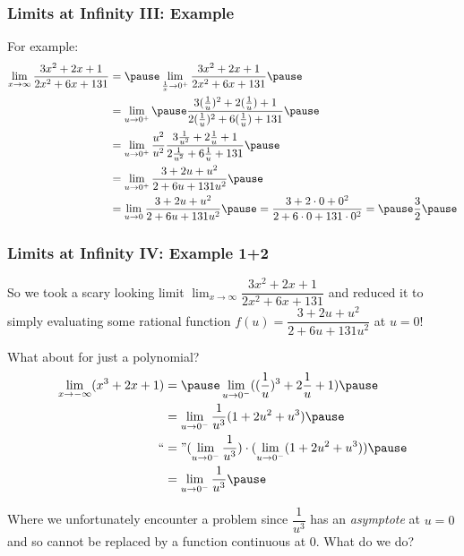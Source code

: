 \documentclass{ltx-talk}
\begin{document}
\begin{frame}
  \frametitle{Limits at Infinity III: Example}

  For example: \pause
  \begin{align}
    \lim_{x \rightarrow \infty} \dfrac{3x^2 + 2x + 1}{2x^2 + 6x + 131} &= \pause \lim_{\frac{1}{x} \rightarrow 0^+} \dfrac{3x^2 + 2x + 1}{2x^2 + 6x + 131} \pause \\
                                                                       &= \lim_{u \rightarrow 0^+} \pause \dfrac{3(\frac{1}{u})^2 + 2(\frac{1}{u}) + 1}{2(\frac{1}{u})^2 + 6(\frac{1}{u}) + 131} \pause \\
                                                                       &= \lim_{u \rightarrow 0^+} \dfrac{u^2}{u^2} \dfrac{3 \frac{1}{u^2} + 2\frac{1}{u} + 1}{2 \frac{1}{u^2} + 6\frac{1}{u} + 131} \pause \\
                                                                       &= \lim_{u \rightarrow 0^+} \dfrac{3 + 2u + u^2}{2 + 6u + 131u^2} \pause \\
                                                                       &= \lim_{u \rightarrow 0} \dfrac{3 + 2u + u^2}{2 + 6u + 131u^2} \pause = \dfrac{3 + 2\cdot 0 + 0^2}{2 + 6\cdot 0 + 131 \cdot 0^2} = \pause \dfrac{3}{2} \pause
  \end{align}
\end{frame}
\begin{frame}
  \frametitle{Limits at Infinity IV: Example 1+2}
  So we took a scary looking limit \pause $\lim_{x \rightarrow \infty} \dfrac{3x^2 + 2x + 1}{2x^2 + 6x + 131}$ \pause
  and reduced it to simply evaluating some rational function \pause $f(u) = \dfrac{3 + 2u + u^2}{2 + 6u + 131u^2}$ at $u = 0$! \pause

  What about for just a polynomial? \pause
  \begin{align}
    \lim_{x \rightarrow - \infty} (x^3 + 2x + 1) &= \pause \lim_{u \rightarrow 0^{-}} ((\dfrac{1}{u})^3 + 2 \dfrac{1}{u} + 1) \pause \\
                                                 &= \lim_{u \rightarrow 0^{-}} \dfrac{1}{u^3} (1 + 2u^2 + u^3) \pause  \\
    ``&=" (\lim_{u \rightarrow 0^{-}} \dfrac{1}{u^3}) \cdot (\lim_{u \rightarrow 0^{-}} (1 + 2u^2 + u^3)) \pause \\
                                                 &= \lim_{u \rightarrow 0^{-}} \dfrac{1}{u^3} \pause
  \end{align}

  Where we unfortunately encounter a problem \pause since $\dfrac{1}{u^3}$ has an \textit{asymptote}
  at $u = 0$ \pause and so cannot be replaced by a function continuous at $0$. \pause What do we do?
\end{frame}
\end{document}
